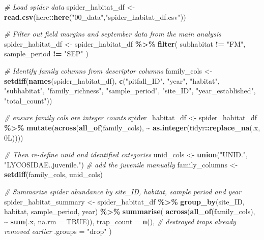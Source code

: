 \documentclass[
]{article}
\newenvironment{Shaded}{\begin{snugshade}}{\end{snugshade}}
\newcommand{\AttributeTok}[1]{\textcolor[rgb]{0.13,0.29,0.53}{#1}}
\newcommand{\CommentTok}[1]{\textcolor[rgb]{0.56,0.35,0.01}{\textit{#1}}}
\newcommand{\ConstantTok}[1]{\textcolor[rgb]{0.56,0.35,0.01}{#1}}
\newcommand{\DataTypeTok}[1]{\textcolor[rgb]{0.13,0.29,0.53}{#1}}
\newcommand{\DecValTok}[1]{\textcolor[rgb]{0.00,0.00,0.81}{#1}}
\newcommand{\FunctionTok}[1]{\textcolor[rgb]{0.13,0.29,0.53}{\textbf{#1}}}
\newcommand{\NormalTok}[1]{#1}
\newcommand{\OtherTok}[1]{\textcolor[rgb]{0.56,0.35,0.01}{#1}}
\newcommand{\SpecialCharTok}[1]{\textcolor[rgb]{0.81,0.36,0.00}{\textbf{#1}}}
\newcommand{\StringTok}[1]{\textcolor[rgb]{0.31,0.60,0.02}{#1}}
\begin{document}
\begin{Shaded}
\begin{Highlighting}[]
\CommentTok{\# Load spider data}
\NormalTok{spider\_habitat\_df }\OtherTok{\textless{}{-}} \FunctionTok{read.csv}\NormalTok{(here}\SpecialCharTok{::}\FunctionTok{here}\NormalTok{(}\StringTok{"00\_data"}\NormalTok{,}\StringTok{"spider\_habitat\_df.csv"}\NormalTok{))}

\CommentTok{\# Filter out field margins and september data from the main analysis}
\NormalTok{spider\_habitat\_df }\OtherTok{\textless{}{-}}\NormalTok{ spider\_habitat\_df }\SpecialCharTok{\%\textgreater{}\%}
  \FunctionTok{filter}\NormalTok{(}
\NormalTok{    subhabitat }\SpecialCharTok{!=} \StringTok{"FM"}\NormalTok{,}
\NormalTok{    sample\_period }\SpecialCharTok{!=} \StringTok{"SEP"}
\NormalTok{  )}

\CommentTok{\# Identify family columns from descriptor columns}
\NormalTok{family\_cols }\OtherTok{\textless{}{-}} \FunctionTok{setdiff}\NormalTok{(}\FunctionTok{names}\NormalTok{(spider\_habitat\_df), }\FunctionTok{c}\NormalTok{(}\StringTok{"pitfall\_ID"}\NormalTok{, }\StringTok{"year"}\NormalTok{, }\StringTok{"habitat"}\NormalTok{, }\StringTok{"subhabitat"}\NormalTok{, }\StringTok{"family\_richness"}\NormalTok{, }\StringTok{"sample\_period"}\NormalTok{, }\StringTok{"site\_ID"}\NormalTok{, }\StringTok{"year\_established"}\NormalTok{, }\StringTok{"total\_count"}\NormalTok{))}

\CommentTok{\# ensure family cols are integer counts}
\NormalTok{spider\_habitat\_df }\OtherTok{\textless{}{-}}\NormalTok{ spider\_habitat\_df }\SpecialCharTok{\%\textgreater{}\%}
  \FunctionTok{mutate}\NormalTok{(}\FunctionTok{across}\NormalTok{(}\FunctionTok{all\_of}\NormalTok{(family\_cols), }\SpecialCharTok{\textasciitilde{}} \FunctionTok{as.integer}\NormalTok{(tidyr}\SpecialCharTok{::}\FunctionTok{replace\_na}\NormalTok{(.x, }\DecValTok{0}\DataTypeTok{L}\NormalTok{))))}

\CommentTok{\# Then re{-}define unid and identified categories}
\NormalTok{unid\_cols }\OtherTok{\textless{}{-}} \FunctionTok{union}\NormalTok{(}\StringTok{"UNID."}\NormalTok{, }\StringTok{"LYCOSIDAE..juvenile."}\NormalTok{)  }\CommentTok{\# add the juvenile manually}
\NormalTok{family\_columns }\OtherTok{\textless{}{-}} \FunctionTok{setdiff}\NormalTok{(family\_cols, unid\_cols)}

\CommentTok{\# Summarize spider abundance by site\_ID, habitat, sample period and year}
\NormalTok{spider\_habitat\_summary }\OtherTok{\textless{}{-}}\NormalTok{ spider\_habitat\_df }\SpecialCharTok{\%\textgreater{}\%}
  \FunctionTok{group\_by}\NormalTok{(site\_ID, habitat, sample\_period, year) }\SpecialCharTok{\%\textgreater{}\%}
  \FunctionTok{summarise}\NormalTok{(}
    \FunctionTok{across}\NormalTok{(}\FunctionTok{all\_of}\NormalTok{(family\_cols), }\SpecialCharTok{\textasciitilde{}} \FunctionTok{sum}\NormalTok{(.x, }\AttributeTok{na.rm =} \ConstantTok{TRUE}\NormalTok{)),}
    \AttributeTok{trap\_count =} \FunctionTok{n}\NormalTok{(),     }\CommentTok{\# destroyed traps already removed earlier}
    \AttributeTok{.groups =} \StringTok{"drop"}
\NormalTok{  )}


\end{Highlighting}
\end{Shaded}
\end{document}
